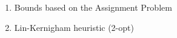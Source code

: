 \documentclass{mprop}
\theoremstyle{definition}
\begin{document}

\begin{enumerate}
\item Bounds based on the Assignment Problem
\item Lin-Kernigham heuristic (2-opt)
\end{enumerate}





\end{document}
